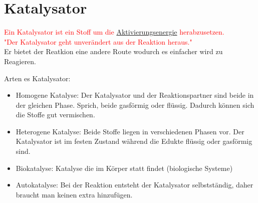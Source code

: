 
\section{Katalysator} \label{sec:katalysator}
\textcolor{red}{Ein Katalysator ist ein Stoff um die \hyperref[sec:aktivierungsenergie]{Aktivierungsenergie} herabzusetzen.} \\
\textcolor{red}{"Der Katalysator geht unverändert aus der Reaktion heraus."} \\
Er bietet der Reatkion eine andere Route wodurch es einfacher wird zu Reagieren.

Arten es Katalysator: 
\begin{itemize}
    \item Homogene Katalyse: 
        Der Katalysator und der Reaktionspartner sind beide in der gleichen Phase. 
        Sprich, beide gasförmig oder flüssig. 
        Dadurch können sich die Stoffe gut vermischen.
    \item Heterogene Katalyse: 
        Beide Stoffe liegen in verschiedenen Phasen vor. 
        Der Katalysator ist im festen Zustand während die Edukte flüssig oder gasförmig sind.
    \item Biokatalyse:
        Katalyse die im Körper statt findet (biologische Systeme)
    \item Autokatalyse: 
        Bei der Reaktion entsteht der Katalysator selbstständig, daher braucht man keinen extra hinzufügen.
\end{itemize}

